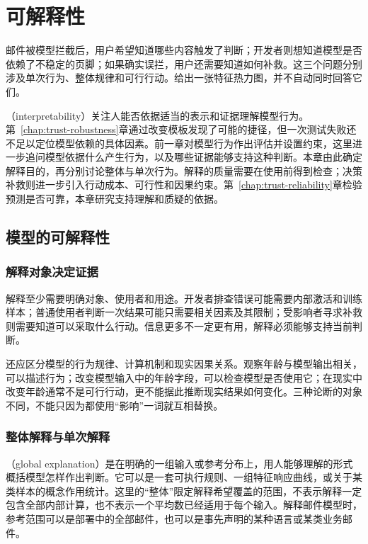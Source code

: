 \chapter{可解释性}
\label{chap:trust-interpretability}

邮件被模型拦截后，用户希望知道哪些内容触发了判断；开发者则想知道模型是否依赖了不稳定的页脚；如果确实误拦，用户还需要知道如何补救。这三个问题分别涉及单次行为、整体规律和可行行动。给出一张特征热力图，并不自动同时回答它们。

（interpretability）关注人能否依据适当的表示和证据理解模型行为。第~\ref{chap:trust-robustness}章通过改变模板发现了可能的捷径，但一次测试失败还不足以定位模型依赖的具体因素。前一章对模型行为作出评估并设置约束，这里进一步追问模型依据什么产生行为，以及哪些证据能够支持这种判断。本章由此确定解释目的，再分别讨论整体与单次行为。解释的质量需要在使用前得到检查；决策补救则进一步引入行动成本、可行性和因果约束。第~\ref{chap:trust-reliability}章检验预测是否可靠，本章研究支持理解和质疑的依据。

\section{模型的可解释性}
\label{sec:interpretability-purpose}

\subsection{解释对象决定证据}

解释至少需要明确对象、使用者和用途。开发者排查错误可能需要内部激活和训练样本；普通使用者判断一次结果可能只需要相关因素及其限制；受影响者寻求补救则需要知道可以采取什么行动。信息更多不一定更有用，解释必须能够支持当前判断。

还应区分模型的行为规律、计算机制和现实因果关系。观察年龄与模型输出相关，可以描述行为；改变模型输入中的年龄字段，可以检查模型是否使用它；在现实中改变年龄通常不是可行行动，更不能据此推断现实结果如何变化。三种论断的对象不同，不能只因为都使用“影响”一词就互相替换。

\subsection{整体解释与单次解释}
\label{sec:interpretability-global-local}

（global explanation）是在明确的一组输入或参考分布上，用人能够理解的形式概括模型怎样作出判断。它可以是一套可执行规则、一组特征响应曲线，或关于某类样本的概念作用统计。这里的“整体”限定解释希望覆盖的范围，不表示解释一定包含全部内部计算，也不表示一个平均数已经适用于每个输入。解释邮件模型时，参考范围可以是部署中的全部邮件，也可以是事先声明的某种语言或某类业务邮件。

